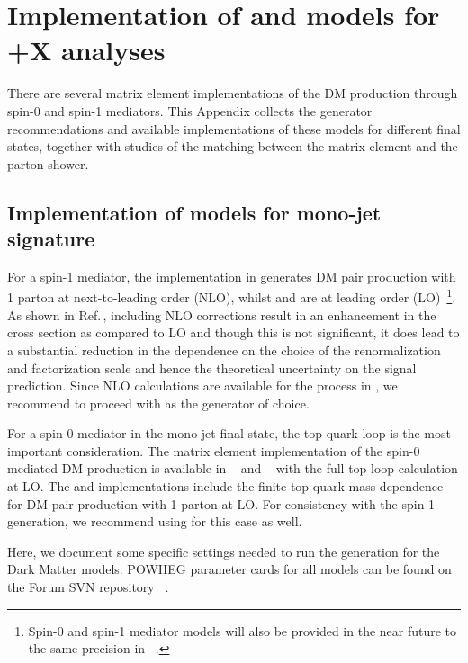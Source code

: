\section{\texorpdfstring{Implementation of \schannel and \tchannel models for \MET+X analyses}{Implementation of \schannel and \tchannel models for MET+X analyses}}

There are several matrix element implementations of the
DM production through spin-0 and spin-1 mediators. This Appendix collects the 
generator recommendations and available implementations
of these models for different final states, together with studies 
of the matching between the matrix element and the parton shower. 

\subsection{Implementation of models for mono-jet signature}
\label{sec:monojet_implementation}

For a spin-1 mediator, the implementation in \powheg generates
DM pair production with 1 parton at next-to-leading order (NLO), 
whilst \madgraph and \mcfm are at leading order (LO)~\footnote{Spin-0 and spin-1 
mediator models will also be provided 
in the near future to the same precision in \madgraph~\cite{Alwall:1405.0301}.}. As shown in \powheg Ref.\,\cite{Haisch:2013ata}, including NLO corrections result in an enhancement in the cross section as compared to LO and though this is not significant, it does lead to a substantial reduction in the dependence on the choice of the renormalization and factorization scale and hence the theoretical uncertainty on the signal prediction. 
Since NLO calculations are available for the process in \powheg, we recommend to proceed with \powheg as the generator of choice. 

For a spin-0 mediator in the mono-jet final state, the top-quark loop is the most important consideration.
The matrix element implementation of the \schannel spin-0 mediated DM production is available in \mcfm~\cite{Fox:2012ru,Harris:2014hga} and \powheg~\cite{Haisch:2015ioa} with the full top-loop calculation at LO.
The \powheg and \mcfm implementations include the finite
top quark mass dependence for DM pair production with 1 parton at LO.
For consistency with the spin-1 generation, we recommend using \powheg
for this case as well.

Here, we document some specific settings needed to run the \powheg 
generation for the Dark Matter models. POWHEG parameter cards for all models
can be found on the Forum SVN repository
~\cite{ForumSVN_DMA, ForumSVN_DMV, ForumSVN_DMS, ForumSVN_DMGG}.


